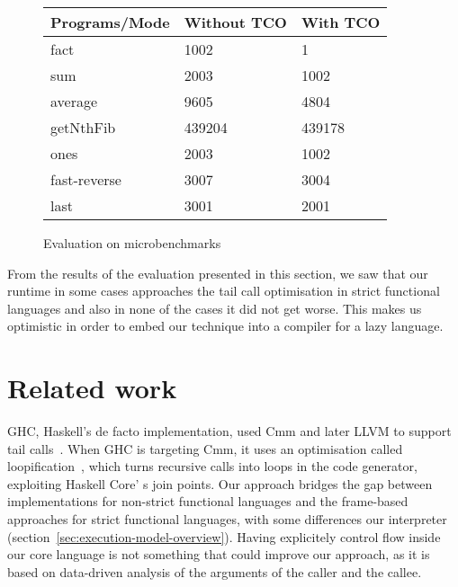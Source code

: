 \documentclass[diploma]{softlab-thesis}
\begin{document}
\begin{center}
  \begin{figure}[h]
  \begin{tabular}{|l|l|l|}
    \hline  
      Programs/Mode & Without TCO & With TCO \\
    \hline 
      fact          & 1002        & 1        \\
    \hline
      sum           & 2003        & 1002     \\
    \hline
      average       & 9605        & 4804     \\
    \hline    
      getNthFib     & 439204      & 439178   \\
    \hline 
      ones          & 2003        & 1002     \\
    \hline
      fast-reverse  & 3007        & 3004     \\
    \hline
      last          & 3001        & 2001     \\
    \hline
  \end{tabular}
  \caption{Evaluation on microbenchmarks\label{fig:measures}}
  \end{figure}
\end{center}

From the results of the evaluation presented in this section, we saw that our runtime 
in some cases approaches the tail call optimisation in strict functional languages and also in none of 
the cases it did not get worse. This makes us optimistic in order to embed our technique into 
a compiler for a lazy language.


% 
\chapter{Related work}
\label{ch:related}

GHC, Haskell's de facto implementation, used Cmm and later LLVM to
support tail calls~\cite{Terei:2010:LBG:1863523.1863538}.  When GHC is
targeting Cmm, it uses an optimisation called
loopification~\cite{Wos10}, which turns recursive calls into loops in
the code generator, exploiting Haskell Core' s join points.  Our
approach bridges the gap between implementations for non-strict
functional languages and the frame-based approaches for strict
functional languages, with some differences our interpreter
(section~\ref{sec:execution-model-overview}). Having explicitely
control flow inside our core language is not something that could
improve our approach, as it is based on data-driven analysis of the
arguments of the caller and the callee.
\end{document}
